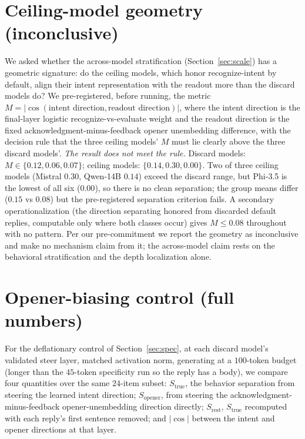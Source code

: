 \documentclass[11pt]{article}
\begin{document}
\section{Ceiling-model geometry (inconclusive)}
\label{app:geometry}
We asked whether the across-model stratification (Section~\ref{sec:scale}) has a geometric signature: do
the ceiling models, which honor recognize-intent by default, align their intent representation with the readout
more than the discard models do? We pre-registered, before running, the metric $M = |\cos(\text{intent
direction}, \text{readout direction})|$, where the intent direction is the final-layer logistic
recognize-vs-evaluate weight and the readout direction is the fixed acknowledgment-minus-feedback opener
unembedding difference, with the decision rule that the three ceiling models' $M$ must lie clearly above the
three discard models'. \emph{The result does not meet the rule.} Discard models: $M \in \{0.12, 0.06, 0.07\}$;
ceiling models: $\{0.14, 0.30, 0.00\}$. Two of three ceiling models (Mistral $0.30$, Qwen-14B $0.14$) exceed
the discard range, but Phi-3.5 is the lowest of all six ($0.00$), so there is no clean separation; the group
means differ ($0.15$ vs $0.08$) but the pre-registered separation criterion fails. A secondary operationalization
(the direction separating honored from discarded default replies, computable only where both classes occur)
gives $M \le 0.08$ throughout with no pattern. Per our pre-commitment we report the geometry as inconclusive and
make no mechanism claim from it; the across-model claim rests on the behavioral stratification and the
depth localization alone.

\section{Opener-biasing control (full numbers)}
\label{app:opener}
For the deflationary control of Section~\ref{sec:spec}, at each discard model's validated steer layer, matched
activation norm, generating at a $100$-token budget (longer than the $45$-token specificity run so the reply has
a body), we compare four quantities over the same $24$-item subset: $S_{\mathrm{true}}$, the behavior separation
from steering the learned intent direction; $S_{\mathrm{opener}}$, from steering the
acknowledgment-minus-feedback opener-unembedding direction directly; $S_{\mathrm{rest}}$, $S_{\mathrm{true}}$
recomputed with each reply's first sentence removed; and $|\cos|$ between the intent and opener directions at
that layer.
\end{document}

